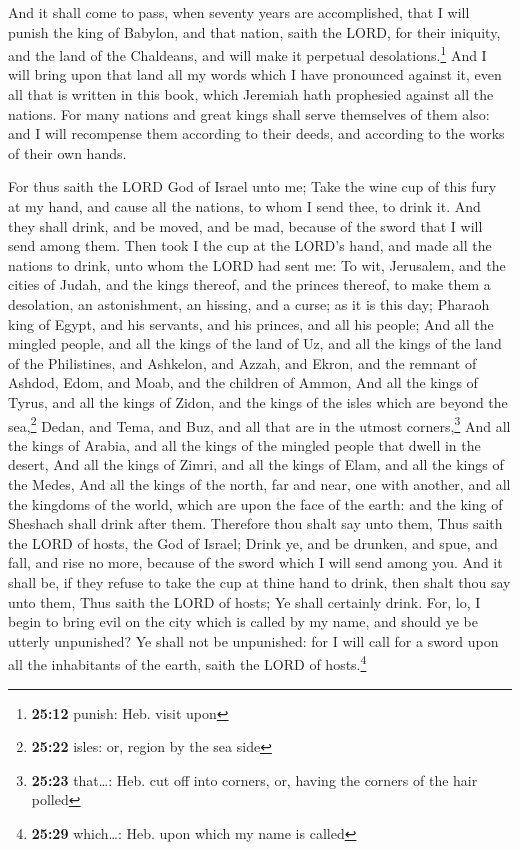  And it shall come to pass, when seventy years are
accomplished, that I will punish the king of Babylon, and that nation,
saith the LORD, for their iniquity, and the land of the Chaldeans, and
will make it perpetual desolations.\footnote{\textbf{25:12} punish: Heb.
  visit upon}  And I will bring upon that land all my
words which I have pronounced against it, even all that is written in
this book, which Jeremiah hath prophesied against all the nations.
 For many nations and great kings shall serve themselves
of them also: and I will recompense them according to their deeds, and
according to the works of their own hands.

 For thus saith the LORD God of Israel unto me; Take the
wine cup of this fury at my hand, and cause all the nations, to whom I
send thee, to drink it.  And they shall drink, and be
moved, and be mad, because of the sword that I will send among them.
 Then took I the cup at the LORD's hand, and made all the
nations to drink, unto whom the LORD had sent me:  To
wit, Jerusalem, and the cities of Judah, and the kings thereof, and the
princes thereof, to make them a desolation, an astonishment, an hissing,
and a curse; as it is this day;  Pharaoh king of Egypt,
and his servants, and his princes, and all his people; 
And all the mingled people, and all the kings of the land of Uz, and all
the kings of the land of the Philistines, and Ashkelon, and Azzah, and
Ekron, and the remnant of Ashdod,  Edom, and Moab, and
the children of Ammon,  And all the kings of Tyrus, and
all the kings of Zidon, and the kings of the isles which are beyond the
sea,\footnote{\textbf{25:22} isles: or, region by the sea side}
 Dedan, and Tema, and Buz, and all that are in the utmost
corners,\footnote{\textbf{25:23} that\ldots: Heb. cut off into corners,
  or, having the corners of the hair polled}  And all the
kings of Arabia, and all the kings of the mingled people that dwell in
the desert,  And all the kings of Zimri, and all the
kings of Elam, and all the kings of the Medes,  And all
the kings of the north, far and near, one with another, and all the
kingdoms of the world, which are upon the face of the earth: and the
king of Sheshach shall drink after them.  Therefore thou
shalt say unto them, Thus saith the LORD of hosts, the God of Israel;
Drink ye, and be drunken, and spue, and fall, and rise no more, because
of the sword which I will send among you.  And it shall
be, if they refuse to take the cup at thine hand to drink, then shalt
thou say unto them, Thus saith the LORD of hosts; Ye shall certainly
drink.  For, lo, I begin to bring evil on the city which
is called by my name, and should ye be utterly unpunished? Ye shall not
be unpunished: for I will call for a sword upon all the inhabitants of
the earth, saith the LORD of hosts.\footnote{\textbf{25:29} which\ldots:
  Heb. upon which my name is called}

